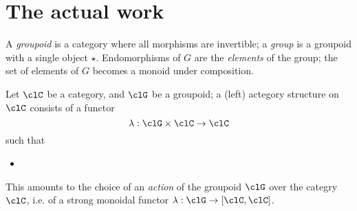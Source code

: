 \documentclass{amsart}
\begin{document}
\section{The actual work}
\begin{definition}[Groupoid]
A \emph{groupoid} is a category where all morphisms are invertible; a \emph{group} is a groupoid with a single object $\star$. Endomorphisms of $G$ are the \emph{elements} of the group; the set of elements of $G$ becomes a monoid under composition.
\end{definition}
\begin{definition}[Actegory]
Let $\clC$ be a category, and $\clG$ be a groupoid; a (left) actegory structure on $\clC$ consists of a functor
\[
\lambda : \clG \times \clC \to \clC
\]
such that
\begin{itemize}
  \item
\end{itemize}
This amounts to the choice of an \emph{action} of the groupoid $\clG$ over the categry $\clC$, i.e. of a strong monoidal functor $\lambda : \clG \to [\clC,\clC]$.
\end{definition}
\end{document}
